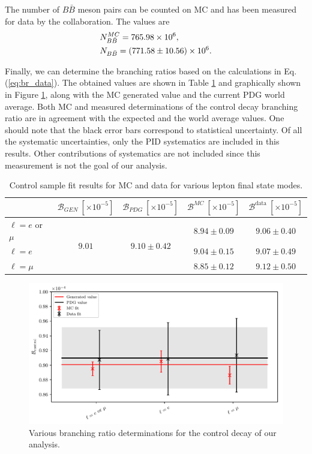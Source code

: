 The number of $B\bar B$ meson pairs can be counted on MC and has been measured for data by the collaboration. The values are
\begin{align*}
&N_{B\bar B}^{MC} = 765.98\times 10^{6},\\
&N_{B\bar B} = (771.58 \pm 10.56)\times 10^{6}.
\end{align*}

Finally, we can determine the branching ratios based on the calculations in Eq. (\ref{eq:br_data}). The obtained values are shown in Table \ref{tab:br_result} and graphically shown in Figure \ref{fig:br_plot}, along with the MC generated value and the current PDG world average. Both MC and measured determinations of the control decay branching ratio are in agreement with the expected and the world average values. One should note that the black error bars correspond to statistical uncertainty. Of all the systematic uncertainties, only the PID systematics are included in this results. Other contributions of systematics are not included since this measurement is not the goal of our analysis.

\begin{table}[H]
	\centering
	\begin{tabular}{l|c|c|c|c}
		& $\mathcal{B}_{GEN}~[\times 10^{-5}]$ & $\mathcal{B}_{PDG}~[\times 10^{-5}]$ & $\mathcal{B}^{MC}~[\times 10^{-5}]$ & $\mathcal{B}^{\mathrm{data}}~[\times 10^{-5}]$ \\
		\toprule
		$\ell = e$ or $\mu$ & \multirow{3}{*}{$9.01$} & \multirow{3}{*}{$9.10\pm0.42$} & $8.94\pm0.09$ & $9.06\pm0.40$\\
		$\ell = e$ & & & $9.04\pm0.15$ & $9.07\pm0.49$ \\
		$\ell = \mu$  & & & $8.85\pm0.12$ & $9.12\pm0.50$\\
		\bottomrule
	\end{tabular}
	\captionsetup{width=.8\linewidth}
	\caption{Control sample fit results for MC and data for various lepton final state modes.}
	\label{tab:br_result}
\end{table}

\begin{figure}[H]
	\centering
	\captionsetup{width=0.8\linewidth}
	\includegraphics[width=\linewidth]{fig/br_plot}
	\caption{Various branching ratio determinations for the control decay of our analysis.}
	\label{fig:br_plot}
\end{figure}

